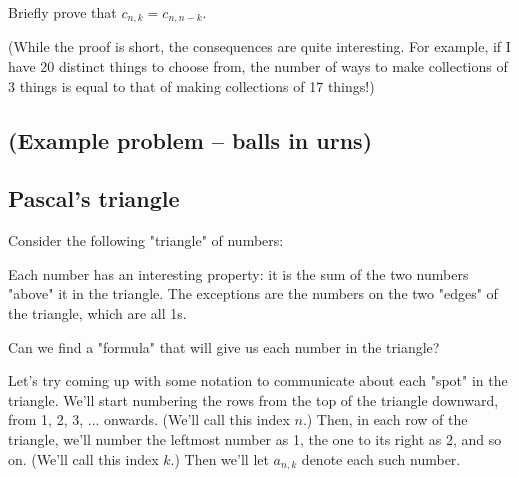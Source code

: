 

\begin{exercise}
\label{ex:binom-coeff-symmetry}
Briefly prove that $c_{n,k} = c_{n,n-k}$.

(While the proof is short, the consequences are quite interesting. For example, if I have 20 distinct things to choose from, the number of ways to make collections of 3 things is equal to that of making collections of 17 things!)
\end{exercise}



\subsection{(Example problem -- balls in urns)}

\subsection{Pascal's triangle}


Consider the following "triangle" of numbers:


Each number has an interesting property: it is the sum of the two numbers "above" it in the triangle. The exceptions are the numbers on the two "edges" of the triangle, which are all 1s.

Can we find a "formula" that will give us each number in the triangle?



Let's try coming up with some notation to communicate about each "spot" in the triangle. We'll start numbering the rows from the top of the triangle downward, from 1, 2, 3, ... onwards. (We'll call this index $n$.) Then, in each row of the triangle, we'll number the leftmost number as 1, the one to its right as 2, and so on. (We'll call this index $k$.) Then we'll let $a_{n,k}$ denote each such number.

